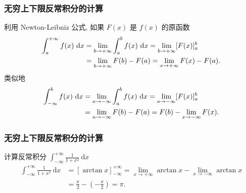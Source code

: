 \documentclass[
10pt,
aspectratio=43,
]{beamer}
\begin{document}
\begin{frame}
	\frametitle{无穷上下限反常积分的计算}
	\everymath{\displaystyle}
	利用 Newton-Leibniz 公式, 如果 $F(x)$ 是 $f(x)$ 的原函数
	$$
		\begin{aligned}
			\int_a^{+\infty} f(x)  \mathrm{~d}x & =\lim _{b \rightarrow+\infty} \int_a^b f(x) \mathrm{~d}x=\lim _{b \rightarrow+\infty}[F(x)]_a^b \\\vspace{0.4cm}
			                                    & =  \lim _{b \rightarrow+\infty} F(b)-F(a)=\lim _{x \rightarrow+\infty} F(x)-F(a) .
		\end{aligned}
	$$
	类似地
	$$
		\begin{aligned}
			\int_{-\infty}^b f(x)  \mathrm{~d}x & =\lim _{a \rightarrow-\infty} \int_a^b f(x) \mathrm{~d}x=\lim _{a \rightarrow-\infty}[F(x)]_a^b \\\vspace{0.4cm}
			                                    & =  \lim _{a \rightarrow-\infty} F(b)-F(a)=F(b)-\lim _{x \rightarrow-\infty} F(x) .
		\end{aligned}
	$$
\end{frame}


\begin{frame}
	\frametitle{无穷上下限反常积分的计算}
	\everymath{\displaystyle}
	\begin{block}{计算反常积分 $\int_{-\infty}^{+\infty} \frac{1}{1+x^2} \mathrm{~d}x$}
		$$
			\begin{aligned}
				\int_{-\infty}^{+\infty} \frac{1}{1+x^2} \mathrm{~d} x & =[\arctan x]_{-\infty}^{+\infty} =\lim _{x \rightarrow+\infty} \arctan x-\lim _{x \rightarrow-\infty} \arctan x \\
				                                                       & =\frac{\pi}{2}-\left(-\frac{\pi}{2}\right)=\pi .
			\end{aligned}
		$$
	\end{block}
\end{frame}
\end{document}
